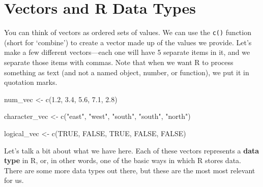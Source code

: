 \documentclass[
  letterpaper,
  DIV=11,
  numbers=noendperiod]{scrreprt}
\newenvironment{Shaded}{\begin{snugshade}}{\end{snugshade}}
\newcommand{\ConstantTok}[1]{\textcolor[rgb]{0.56,0.35,0.01}{#1}}
\newcommand{\FloatTok}[1]{\textcolor[rgb]{0.68,0.00,0.00}{#1}}
\newcommand{\FunctionTok}[1]{\textcolor[rgb]{0.28,0.35,0.67}{#1}}
\newcommand{\NormalTok}[1]{\textcolor[rgb]{0.00,0.23,0.31}{#1}}
\newcommand{\OtherTok}[1]{\textcolor[rgb]{0.00,0.23,0.31}{#1}}
\newcommand{\StringTok}[1]{\textcolor[rgb]{0.13,0.47,0.30}{#1}}
\begin{document}
\section{Vectors and R Data Types}\label{vectors-and-r-data-types}

You can think of vectors as ordered sets of values. We can use the
\texttt{c()} function (short for `combine') to create a vector made up
of the values we provide. Let's make a few different vectors---each one
will have 5 separate items in it, and we separate those items with
commas. Note that when we want R to process something as text (and not a
named object, number, or function), we put it in quotation marks.

\begin{Shaded}
\begin{Highlighting}[]
\NormalTok{num\_vec }\OtherTok{\textless{}{-}} \FunctionTok{c}\NormalTok{(}\FloatTok{1.2}\NormalTok{, }\FloatTok{3.4}\NormalTok{, }\FloatTok{5.6}\NormalTok{, }\FloatTok{7.1}\NormalTok{, }\FloatTok{2.8}\NormalTok{)}

\NormalTok{character\_vec }\OtherTok{\textless{}{-}} \FunctionTok{c}\NormalTok{(}\StringTok{"east"}\NormalTok{, }\StringTok{"west"}\NormalTok{, }\StringTok{"south"}\NormalTok{, }\StringTok{"south"}\NormalTok{, }\StringTok{"north"}\NormalTok{) }

\NormalTok{logical\_vec }\OtherTok{\textless{}{-}} \FunctionTok{c}\NormalTok{(}\ConstantTok{TRUE}\NormalTok{, }\ConstantTok{FALSE}\NormalTok{, }\ConstantTok{TRUE}\NormalTok{, }\ConstantTok{FALSE}\NormalTok{, }\ConstantTok{FALSE}\NormalTok{) }
\end{Highlighting}
\end{Shaded}

Let's talk a bit about what we have here. Each of these vectors
represents a \textbf{data type} in R, or, in other words, one of the
basic ways in which R stores data. There are some more data types out
there, but these are the most most relevant for us.
\end{document}
